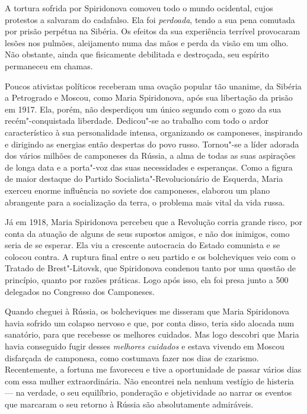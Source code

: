 A tortura sofrida por Spiridonova comoveu todo o mundo ocidental, cujos protestos
a salvaram do cadafalso. Ela foi \textit{perdoada}, tendo a sua pena comutada
por prisão perpétua na Sibéria. Os efeitos da sua experiência terrível
provocaram lesões nos pulmões, aleijamento numa das mãos e perda da
visão em um olho. Não obstante, ainda que fisicamente debilitada e
destroçada, seu espírito permaneceu em chamas.

Poucos ativistas políticos receberam uma ovação popular tão unanime, da
Sibéria a Petrogrado e Moscou, como Maria Spiridonova, após sua
libertação da prisão em 1917. Ela, porém, não desperdiçou um único
segundo com o gozo da sua recém"-conquistada liberdade. Dedicou"-se ao
trabalho com todo o ardor característico à sua personalidade intensa,
organizando os camponeses, inspirando e dirigindo as energias então
despertas do povo russo. Tornou"-se a líder adorada dos vários milhões de
camponeses da Rússia, a alma de todas as suas aspirações de longa data e
a porta"-voz das suas necessidades e esperanças. Como a figura de maior
destaque do Partido Socialista"-Revolucionário de Esquerda, Maria exerceu
enorme influência no soviete dos camponeses, elaborou um plano
abrangente para a socialização da terra, o problema mais vital da vida
russa.

Já em 1918, Maria Spiridonova percebeu que a Revolução corria grande
risco, por conta da atuação de alguns de seus supostos amigos, e não dos
inimigos, como seria de se esperar. Ela viu a crescente autocracia do Estado comunista e se
colocou contra. A ruptura final entre o seu partido e os
bolcheviques veio com o Tratado de Brest"-Litovsk, que Spiridonova condenou
tanto por uma questão de princípio, quanto por razões práticas. Logo após
isso, ela foi presa junto a 500 delegados no Congresso dos Camponeses.

Quando cheguei à Rússia, os bolcheviques me disseram que Maria
Spiridonova havia sofrido um colapso nervoso e que, por conta disso,
teria sido alocada num sanatório, para que recebesse os melhores
cuidados. Mas logo descobri que Maria havia conseguido fugir desses \textit{melhores
cuidados} e estava vivendo em Moscou disfarçada de camponesa, como
costumava fazer nos dias de czarismo. Recentemente, a fortuna me
favoreceu e tive a oportunidade de passar vários dias com essa mulher
extraordinária. Não encontrei nela nenhum vestígio de histeria --- na
verdade, o seu equilíbrio, ponderação e objetividade ao narrar os
eventos que marcaram o seu retorno à Rússia são absolutamente
admiráveis.

